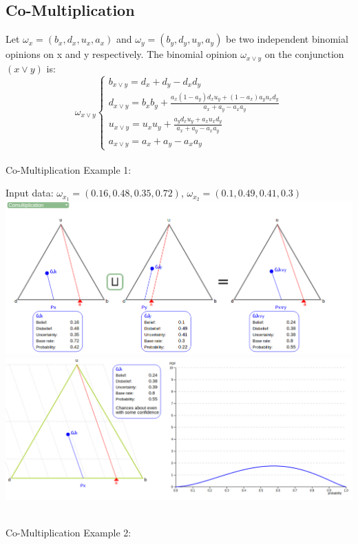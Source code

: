 \documentclass[UTF8]{article}
\newcommand{\opinion}[5]{$\omega_{#1} = (#2, #3, #4, #5)$}
\begin{document}
\subsection{Co-Multiplication}
Let \opinion{x}{b_x}{d_x}{u_x}{a_x} and \opinion{y}{b_y}{d_y}{u_y}{a_y} be two independent binomial opinions on x and y respectively. The binomial opinion $\omega_{x \lor y}$ on the conjunction $(x \lor y)$ is:
$$
\omega_{x \lor y}
\begin{cases}
    b_{x \lor y} = d_x + d_y - d_xd_y\\
    d_{x \lor y} = b_xb_y+ \frac{a_x(1 - a_y)d_xu_y + (1 - a_x)a_yu_xd_y}{a_x + a_y - a_xa_y}\\    
    u_{x \lor y} = u_xu_y+ \frac{a_yd_xu_y+a_xu_xd_y}{a_x+a_y-a_xa_y}\\
    a_{x \lor y} = a_x + a_y - a_xa_y
\end{cases}
$$\\
Co-Multiplication Example 1:\\
\begin{center}
    Input data:
    \opinion{x_1}{0.16}{0.48}{0.35}{0.72}, 
    \opinion{x_2}{0.1}{0.49}{0.41}{0.3}\\
    \includegraphics[width=6in]{images/comul1.png}
    \includegraphics[width=6in]{images/comul1viz.png}
\end{center}
\hrulefill\\
Co-Multiplication Example 2:
\end{document}
